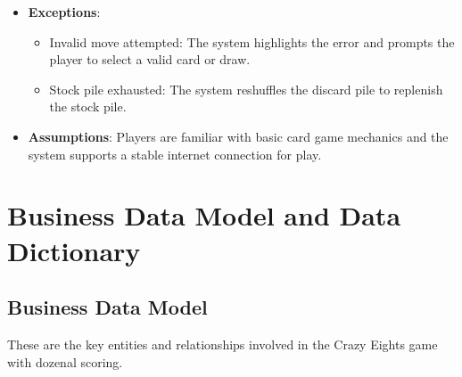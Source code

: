 \documentclass[12pt]{article}
\begin{document}
\begin{itemize}
\begin{enumerate}
    \end{enumerate}
    \item \textbf{Exceptions}:
    \begin{itemize}
        \item Invalid move attempted: The system highlights the error and prompts the player to select a valid card or draw.
        \item Stock pile exhausted: The system reshuffles the discard pile to replenish the stock pile.
    \end{itemize}
    \item \textbf{Assumptions}: Players are familiar with basic card game mechanics and the system supports a stable internet connection for play.
\end{itemize}

\section{Business Data Model and Data Dictionary}
\subsection{Business Data Model}

These are the key entities and relationships involved in the Crazy Eights game with dozenal scoring.
\end{document}
